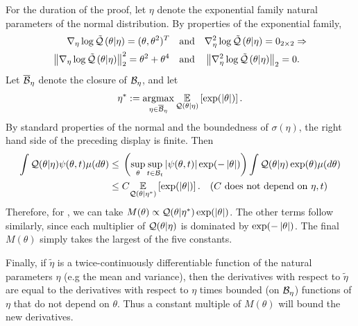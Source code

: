 

%
For the duration of the proof, let $\eta$ denote the exponential family natural
parameters of the normal distribution. By properties of the exponential family,
%
\begin{align*}
%
\lqgrad{\theta \vert \eta} ={} (\theta, \theta^2)^T \mathand&
\lqhess{\theta \vert \eta} ={} 0_{2\times2} \Rightarrow\\
%
\norm{\lqgrad{\theta \vert \eta}}_2^2 ={} \theta^2 + \theta^4 \mathand&
\norm{\lqhess{\theta \vert \eta}}_2 ={} 0.
%
\end{align*}
%
Let $\overline{\mathcal{B}}_\eta$ denote the closure of $\mathcal{B}_\eta$, and let
%
\begin{align*}
%
\eta^* := \argmax_{\eta \in \ballclosed_\eta}
    \expect{\q(\theta \vert \eta)}{\exp(\abs{\theta})}.
%
\end{align*}
%
By standard properties of the normal and the boundedness of $\sigma(\eta)$, the
right hand side of the preceding display is finite.
%
Then
%
\begin{align*}
\int \q(\theta \vert \eta) \psi(\theta, \t) \mu(d \theta) \le{}&
    \left( \sup_{\theta} \sup_{\t \in \ball_\t}
        \abs{\psi(\theta, \t)} \exp(-\abs{\theta}) \right)
    \int \q(\theta \vert \eta) \exp(\theta) \mu(d \theta)
%
\\\le{}&
    \const
    \expect{\q(\theta \vert \eta^*)}{\exp(\abs{\theta})}.
    \quad\constdesc{\eta, \t}
%
\end{align*}
%
Therefore, for , we can take $M(\theta)
\propto \mathcal{Q}(\theta \vert \eta^*) \exp(\left|\theta\right|)$. The other terms follow
similarly, since each multiplier of $\mathcal{Q}(\theta \vert \eta)$ is dominated by
$\exp(-\left|\theta\right|)$.  The final $M(\theta)$ simply takes the largest
of the five constants.

Finally, if $\tilde{\eta}$ is a twice-continuously differentiable function of
the natural parameters $\eta$ (e.g the mean and variance), then the derivatives
with respect to $\tilde{\eta}$ are equal to the derivatives with respect to
$\eta$ times bounded (on $\mathcal{B}_\eta$) functions of $\eta$ that do not depend on
$\theta$. Thus a constant multiple of $M(\theta)$ will bound the new
derivatives.
%

